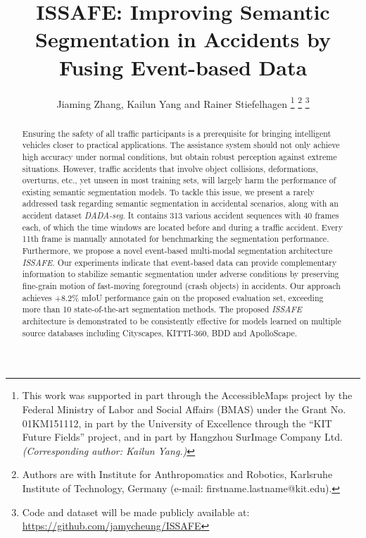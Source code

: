 \documentclass[letterpaper, 10 pt, conference]{ieeeconf}
\begin{document}

\title{\LARGE \bf ISSAFE: Improving Semantic Segmentation in Accidents by Fusing Event-based Data}
\author{Jiaming Zhang, Kailun Yang and Rainer Stiefelhagen
\thanks{This work was supported in part through the AccessibleMaps project by the Federal Ministry of Labor and Social Affairs (BMAS) under the Grant No. 01KM151112, in part by the University of Excellence through the ``KIT Future Fields'' project,  and in part by Hangzhou SurImage Company Ltd.
\textit{(Corresponding author: Kailun Yang.)}}
\thanks{Authors are with Institute for Anthropomatics and Robotics, Karlsruhe Institute of Technology, Germany (e-mail: firstname.lastname@kit.edu).}
\thanks{Code and dataset will be made publicly available at: \url{https://github.com/jamycheung/ISSAFE}}
}
\maketitle


\begin{abstract}
Ensuring the safety of all traffic participants is a prerequisite for bringing intelligent vehicles closer to practical applications. The assistance system should not only achieve high accuracy under normal conditions, but obtain robust perception against extreme situations. However, traffic accidents that involve object collisions, deformations, overturns, etc., yet unseen in most training sets, will largely harm the performance of existing semantic segmentation models. To tackle this issue, we present a rarely addressed task regarding semantic segmentation in accidental scenarios, along with an accident dataset \textit{DADA-seg}. It contains 313 various accident sequences with 40 frames each, of which the time windows are located before and during a traffic accident. Every 11th frame is manually annotated for benchmarking the segmentation performance. Furthermore, we propose a novel event-based multi-modal segmentation architecture \textit{ISSAFE}. Our experiments indicate that event-based data can provide complementary information to stabilize semantic segmentation under adverse conditions by preserving fine-grain motion of fast-moving foreground (crash objects) in accidents. Our approach achieves +8.2\% mIoU performance gain on the proposed evaluation set, exceeding more than 10 state-of-the-art segmentation methods. The proposed \textit{ISSAFE} architecture is demonstrated to be consistently effective for models learned on multiple source databases including Cityscapes, KITTI-360, BDD and ApolloScape. 
\end{abstract}
\end{document}
